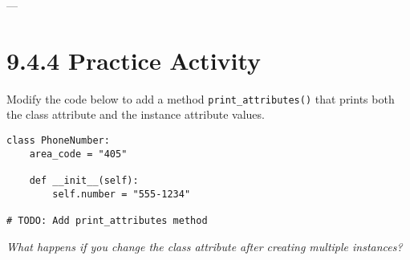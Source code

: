 ---

\section*{9.4.4 Practice Activity}

Modify the code below to add a method \texttt{print\_attributes()} 
that prints both the class attribute and the instance attribute values.

\begin{verbatim}
class PhoneNumber:
    area_code = "405"

    def __init__(self):
        self.number = "555-1234"

# TODO: Add print_attributes method
\end{verbatim}

\begin{center}
\textit{What happens if you change the class attribute after creating multiple instances?}
\end{center}

